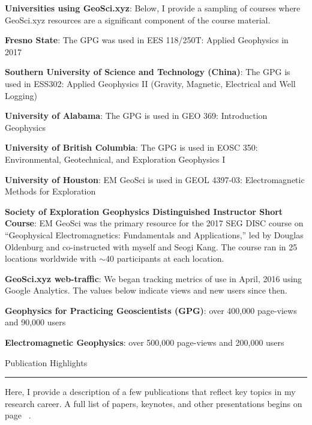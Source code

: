 \documentclass[a4paper, 11pt]{article}
\newcommand{\heading}[1]{
    \begin{minipage}[t]{\textwidth}
    \vspace{0.05cm}
    {\LARGE #1}\\
    \vspace{-0.24cm}
    \hrule
    \end{minipage}
    \vspace{0.05cm}

}
\begin{document}
\textbf{Universities using GeoSci.xyz}: Below, I provide a sampling of courses where GeoSci.xyz resources are a significant component of the course material.
\begin{myitemize}\vspace{0.3cm}
\item \textbf{Fresno State}: The GPG was used in EES 118/250T: Applied Geophysics in 2017
\item \textbf{Southern University of Science and Technology (China)}: The GPG is used in ESS302: Applied Geophysics II (Gravity, Magnetic, Electrical and Well Logging)
\item \textbf{University of Alabama}: The GPG is used in GEO 369: Introduction Geophysics
\item \textbf{University of British Columbia}: The GPG is used in EOSC 350: Environmental, Geotechnical, and Exploration Geophysics I
\item \textbf{University of Houston}: EM GeoSci is used in GEOL 4397-03: Electromagnetic Methods for Exploration
\end{myitemize}\vspace{0.3cm}

\textbf{Society of Exploration Geophysics Distinguished Instructor Short Course}: EM GeoSci was the primary resource for the 2017 SEG DISC course on ``Geophysical Electromagnetics: Fundamentals and Applications,'' led by Douglas Oldenburg and co-instructed with myself and Seogi Kang. The course ran in 25 locations worldwide with $\sim$40 participants at each location.\vspace{0.3cm}

\textbf{GeoSci.xyz web-traffic}: We began tracking metrics of use in April, 2016 using Google Analytics. The values below indicate views and new users since then.
\begin{myitemize}\vspace{0.3cm}
\item \textbf{Geophysics for Practicing Geoscientists (GPG)}: over 400,000 page-views and 90,000 users
\item \textbf{Electromagnetic Geophysics}: over 500,000 page-views and 200,000 users
\end{myitemize}\vspace{0.3cm}


\heading{Publication Highlights}

Here, I provide a description of a few publications that reflect key topics in my research career.
A full list of papers, keynotes, and other presentations begins on page ~\pageref{sec:publications}.
\end{document}
